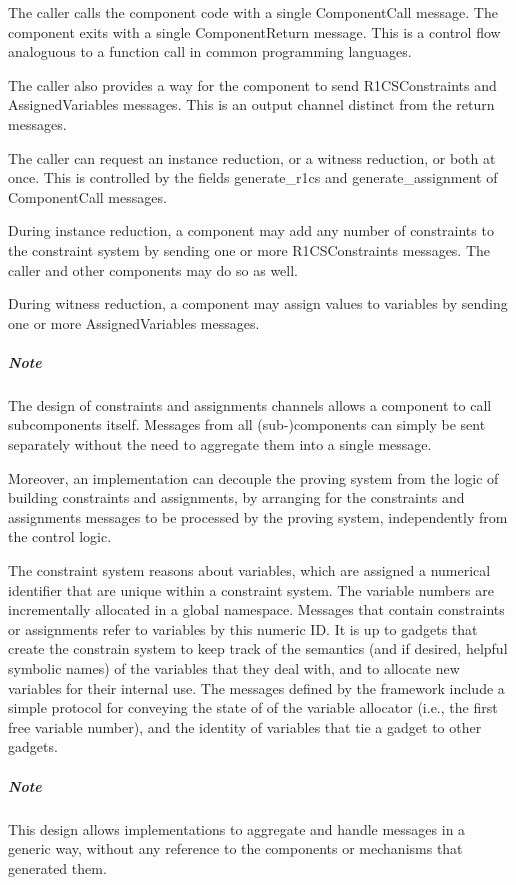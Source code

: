 	The caller calls the component code with a single \textsf{ComponentCall} message.
	The component exits with a single ComponentReturn message.
	This is a control flow analoguous to a function call in common programming languages.

	The caller also provides a way for the component to send 
	R1CSConstraints and AssignedVariables messages.
	This is an output channel distinct from the return messages.

	The caller can request an instance reduction, or a witness reduction, or both at once.
	This is controlled by the fields generate\_r1cs and generate\_assignment of ComponentCall messages.

	During instance reduction,
	a component may add any number of constraints to the constraint system
	by sending one or more R1CSConstraints messages.
	The caller and other components may do so as well.

	During witness reduction,
	a component may assign values to variables
	by sending one or more AssignedVariables messages.

	\subparagraph{Note}
	The design of constraints and assignments channels
	allows a component to call subcomponents itself.
	Messages from all (sub-)components can simply be sent separately
	without the need to aggregate them into a single message.
	
	Moreover, an implementation can decouple the proving system
	from the logic of building constraints and assignments,
	by arranging for the constraints and assignments messages
	to be processed by the proving system, independently from the control logic.

	The constraint system reasons about variables, which are assigned a numerical identifier that are unique within a constraint system. The variable numbers are incrementally allocated in a global namespace. Messages that contain constraints or assignments refer to variables by this numeric ID. It is up to gadgets that create the constrain system to keep track of the semantics (and if desired, helpful symbolic names) of the variables that they deal with, and to allocate new variables for their internal use. The messages defined by the framework include a simple protocol for conveying the state of of the variable allocator (i.e., the first free variable number), and the identity of variables that tie a gadget to other gadgets.
	
	\subparagraph{Note}
	This design allows implementations to aggregate and handle messages in a generic way,
	without any	reference to the components or mechanisms that generated them.

